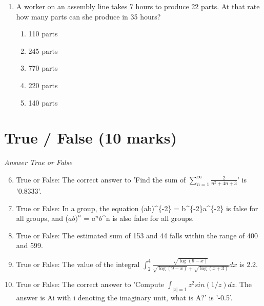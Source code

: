 \documentclass[12pt]{article}
\begin{document}
\begin{enumerate}[label=\arabic*.]
\begin{enumerate}[label=(\alph*)]
    \item 35
    \item 17
    \item 13
    \item 9
\end{enumerate}
\item A worker on an assembly line takes 7 hours to produce 22 parts. At that rate how many parts can she produce in 35 hours?
\begin{enumerate}[label=(\alph*)]
    \item 110 parts
    \item 245 parts
    \item 770 parts
    \item 220 parts
    \item 140 parts
\end{enumerate}
\end{enumerate}

\section*{True / False (10 marks)}
\textit{Answer True or False}
\begin{enumerate}[label=\arabic*.]
\setcounter{enumi}{5}
\item True or False: The correct answer to 'Find the sum of $\sum_{n=1}^{\infty} \frac{2}{n^2 + 4 n + 3}$' is '0.8333'.
\item True or False: In a group, the equation (ab)^\{-2\} = b^\{-2\}a^\{-2\} is false for all groups, and ($ab)^n$ = $a^nb$^n is also false for all groups.
\item True or False: The estimated sum of 153 and 44 falls within the range of 400 and 599.
\item True or False: The value of the integral \( \int_2^4 \frac{\sqrt{\log(9-x)}}{\sqrt{\log(9-x)}+\sqrt{\log(x+3)}} dx \) is 2.2.
\item True or False: The correct answer to 'Compute $\int_{|z| = 1} z^2 sin(1/z) dz$. The answer is Ai with i denoting the imaginary unit, what is A?' is '-0.5'.
\end{enumerate}
\end{document}
